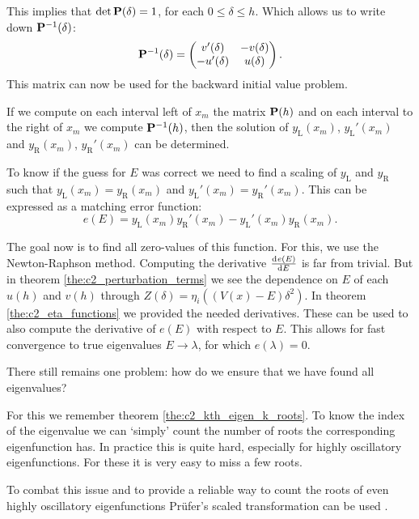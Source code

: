 This implies that $\det\vb{P}(\delta) = 1$, for each $0\leq \delta\leq h$. Which allows us to write down $\vb{P}^{-1}(\delta)$:
$$
    \vb{P}^{-1}(\delta) = \begin{pmatrix} v'(\delta) & -v(\delta) \\ -u'(\delta) & u(\delta) \end{pmatrix}\text{.}
$$
This matrix can now be used for the backward initial value problem.

If we compute on each interval left of $x_m$ the matrix $\vb{P}(h)$ and on each interval to the right of $x_m$ we compute $\vb{P}^{-1}(h)$, then the solution of $y_\text{L}(x_m)$, $y_\text{L}'(x_m)$ and $y_\text{R}(x_m)$, $y_\text{R}'(x_m)$ can be determined.

To know if the guess for $E$ was correct we need to find a scaling of $y_\text{L}$ and $y_\text{R}$ such that $y_\text{L}(x_m) = y_\text{R}(x_m)$ and $y_\text{L}'(x_m) = y_\text{R}'(x_m)$. This can be expressed as a matching error function:
$$
    e(E) = y_\text{L}(x_m) y_\text{R}'(x_m) - y_\text{L}'(x_m) y_\text{R}(x_m)\text{.}
$$

The goal now is to find all zero-values of this function. For this, we use the Newton-Raphson method. Computing the derivative $\dv[]{e(E)}{E}$ is far from trivial. But in theorem \ref{the:c2_perturbation_terms} we see the dependence on $E$ of each $u(h)$ and $v(h)$ through $Z(\delta) = \eta_i\left((V(x) - E)\delta^2\right)$. In theorem \ref{the:c2_eta_functions} we provided the needed derivatives. These can be used to also compute the derivative of $e(E)$ with respect to $E$. This allows for fast convergence to true eigenvalues $E \to \lambda$, for which $e(\lambda) = 0$.


There still remains one problem: how do we ensure that we have found all eigenvalues?

For this we remember theorem \ref{the:c2_kth_eigen_k_roots}. To know the index of the eigenvalue we can `simply' count the number of roots the corresponding eigenfunction has. In practice this is quite hard, especially for highly oscillatory eigenfunctions. For these it is very easy to miss a few roots.

To combat this issue and to provide a reliable way to count the roots of even highly oscillatory eigenfunctions Prüfer's scaled transformation can be used \cite{pruefer_neue_1926}.

